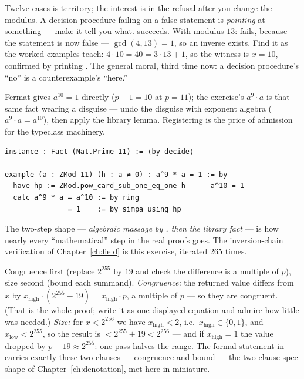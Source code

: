 \pathway Twelve cases is  territory; the interest is in the
refusal after you change the modulus. A decision procedure failing on a
false statement is \emph{pointing} at something --- make it tell you what.
\answer {} succeeds.
With modulus $13$:  fails, because the statement is now
false --- $\gcd(4,13) = 1$, so an inverse exists. Find it as the worked
examples teach: $4 \cdot 10 = 40 = 3 \cdot 13 + 1$, so the witness is
$x = 10$, confirmed by  printing .
The general moral, third time now: a decision procedure's ``no'' is a
counterexample's ``here.''

\pathway Fermat gives $a^{10} = 1$ directly ($p - 1 = 10$ at $p = 11$);
the exercise's $a^9 \cdot a$ is that same fact wearing a disguise ---
undo the disguise with exponent algebra ($a^9 \cdot a = a^{10}$), then
apply the library lemma. Registering  is the
price of admission for the typeclass machinery.
\answer
\begin{lstlisting}[language=Lean]
instance : Fact (Nat.Prime 11) := ⟨by decide⟩

example (a : ZMod 11) (h : a ≠ 0) : a^9 * a = 1 := by
  have hp := ZMod.pow_card_sub_one_eq_one h   -- a^10 = 1
  calc a^9 * a = a^10 := by ring
       _       = 1    := by simpa using hp
\end{lstlisting}
The two-step shape --- \emph{algebraic massage by , then the
library fact} --- is how nearly every ``mathematical'' step in the real
proofs goes. The inversion-chain verification of
Chapter~\ref{ch:field} is this exercise, iterated 265 times.

\pathway Congruence first (replace $2^{255}$ by $19$ and check the
difference is a multiple of $p$), size second (bound each summand).
\answer \emph{Congruence:} the returned value differs from $x$ by
$x_{\mathrm{high}} \cdot (2^{255} - 19) = x_{\mathrm{high}} \cdot p$, a
multiple of $p$ --- so they are congruent. (That is the whole proof; write
it as one displayed equation and admire how little was needed.)
\emph{Size:} for $x < 2^{256}$ we have $x_{\mathrm{high}} < 2$, i.e.\
$x_{\mathrm{high}} \in \{0, 1\}$, and $x_{\mathrm{low}} < 2^{255}$, so the
result is $< 2^{255} + 19 < 2^{256}$ --- and if $x_{\mathrm{high}} = 1$
the value dropped by $p - 19 \approx 2^{255}$: one pass halves the range.
The formal statement in \code{dalek-ed25519-verified} carries exactly
these two clauses --- congruence and bound --- the two-clause spec shape
of Chapter~\ref{ch:denotation}, met here in miniature.


